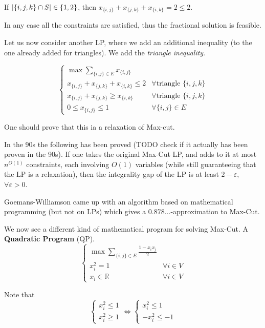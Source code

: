     If $\vert \{i,j,k\} \cap S \vert \in \{1,2\}$, then $x_{\{i,j\}} + x_{\{j,k\}} + x_{\{i,k\}} = 2 \leq 2$.

    In any case all the constraints are satisfied, thus the fractional solution is feasible.

    Let us now consider another LP, where we add an additional inequality (to the one already added for triangles).
    We add the \textit{triangle inequality}.

    \begin{equation}
        \begin{cases}
            \max \sum_{\{i,j\} \in E} x_{\{i,j\}}\\
            x_{\{i,j\}} + x_{\{j,k\}} + x_{\{i,k\}} \leq 2  & \forall \text{triangle } \{i,j,k\}\\
            x_{\{i,j\}} + x_{\{j,k\}} \geq x_{\{i,k\}}      & \forall \text{triangle } \{i,j,k\}\\
            0 \leq x_{\{i,j\}} \leq 1                       & \forall \{i,j\} \in E
        \end{cases}
    \end{equation}

    One should prove that this ia a relaxation of Max-cut.

    In the 90s the following has been proved (TODO check if it actually has been proven in the 90s).
    If one takes the original Max-Cut LP, and adds to it at most $n^{O(1)}$ constraints, each involving $O(1)$ variables (while still guaranteeing that the LP is a relaxation), then the integrality gap of the LP is at least $2 - \varepsilon$, $\forall \varepsilon > 0$.

    Goemans-Williamson came up with an algorithm based on mathematical programming (but not on LPs) which gives a $0.878\dots$-approximation to Max-Cut.

    We now see a different kind of mathematical program for solving Max-Cut. A \textbf{Quadratic Program} (QP).
    \begin{equation}
        \begin{cases}
            \max \sum_{\{i,j\} \in E} \frac{1 - x_i x_j}{2}\\
            x_i^2 = 1           & \forall i \in V\\
            x_i \in \mathbb{R}  & \forall i \in V
        \end{cases}
    \end{equation}

    Note that
    \begin{equation}
        \begin{cases}
            x_i^2 \leq 1\\
            x_i^2 \geq 1
        \end{cases}
        \Longleftrightarrow 
        \begin{cases}
            x_i^2 \leq 1\\
            -x_i^2 \leq -1
        \end{cases}
    \end{equation}

